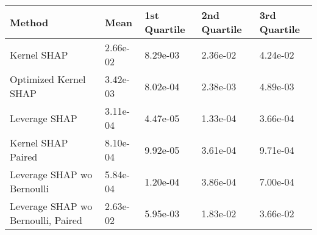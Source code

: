 \begin{tabular}{lllll}
  \toprule
  \textbf{Method} & \textbf{Mean} & \textbf{1st Quartile} & \textbf{2nd Quartile} & \textbf{3rd Quartile} \\ \midrule 
Kernel SHAP & 2.66e-02 & 8.29e-03 & 2.36e-02 & 4.24e-02\\
Optimized Kernel SHAP & 3.42e-03 & 8.02e-04 & 2.38e-03 & 4.89e-03\\
Leverage SHAP & \cellcolor{gold!60}3.11e-04 & \cellcolor{gold!60}4.47e-05 & \cellcolor{gold!60}1.33e-04 & \cellcolor{gold!60}3.66e-04\\
Kernel SHAP Paired & \cellcolor{bronze!60}8.10e-04 & \cellcolor{silver!60}9.92e-05 & \cellcolor{silver!60}3.61e-04 & \cellcolor{bronze!60}9.71e-04\\
Leverage SHAP wo Bernoulli & \cellcolor{silver!60}5.84e-04 & \cellcolor{bronze!60}1.20e-04 & \cellcolor{bronze!60}3.86e-04 & \cellcolor{silver!60}7.00e-04\\
Leverage SHAP wo Bernoulli, Paired & 2.63e-02 & 5.95e-03 & 1.83e-02 & 3.66e-02\\
\bottomrule
\end{tabular}